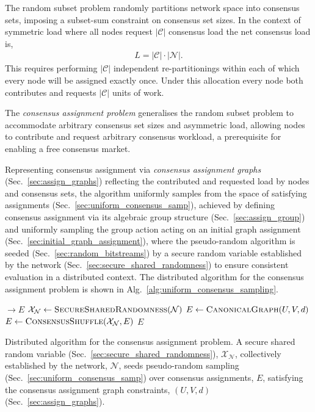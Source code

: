The random subset problem randomly partitions network space into consensus sets, imposing a subset-sum constraint on consensus set sizes. In the context of symmetric load where all nodes request $|\mathcal{C}|$ consensus load the net consensus load is,
\begin{align}
	L = |\mathcal{C}| \cdot |\mathcal{N}|.
\end{align}
This requires performing $|\mathcal{C}|$ independent re-partitionings within each of which every node will be assigned exactly once. Under this allocation every node both contributes and requests $|\mathcal{C}|$ units of work.

The \emph{consensus assignment problem} generalises the random subset problem to accommodate arbitrary consensus set sizes and asymmetric load, allowing nodes to contribute and request arbitrary consensus workload, a prerequisite for enabling a free consensus market.

Representing consensus assignment via \emph{consensus assignment graphs} (Sec.~\ref{sec:assign_graphs}) reflecting the contributed and requested load by nodes and consensus sets, the algorithm uniformly samples from the space of satisfying assignments (Sec.~\ref{sec:uniform_consensus_samp}), achieved by defining consensus assignment via its algebraic group structure (Sec.~\ref{sec:assign_group}) and uniformly sampling the group action acting on an initial graph assignment (Sec.~\ref{sec:initial_graph_assignment}), where the pseudo-random algorithm is seeded (Sec.~\ref{sec:random_bitstreams}) by a secure random variable established by the network (Sec.~\ref{sec:secure_shared_randomness}) to ensure consistent evaluation in a distributed context. The distributed algorithm for the consensus assignment problem is shown in Alg.~\ref{alg:uniform_consensus_sampling}.

\begin{algorithm}[H]
	\begin{algorithmic}
		 $\to E$
		\State $\mathcal{X}_\mathcal{N} \gets \textsc{SecureSharedRandomness}(\mathcal{N})$
		\State $E \gets \textsc{CanonicalGraph}(U,V,d)$
		\State $E \gets \textsc{ConsensusShuffle}(\mathcal{X}_\mathcal{N}, E)$
		\State \Return $E$
		\EndFunction
	\end{algorithmic}
	\caption{Distributed algorithm for the consensus assignment problem. A secure shared random variable (Sec.~\ref{sec:secure_shared_randomness}), $\mathcal{X}_\mathcal{N}$, collectively established by the network, $\mathcal{N}$, seeds pseudo-random sampling (Sec.~\ref{sec:uniform_consensus_samp}) over consensus assignments, $E$, satisfying the consensus assignment graph constraints, $(U,V,d)$ (Sec.~\ref{sec:assign_graphs}).} \label{alg:uniform_consensus_sampling}
\end{algorithm}

